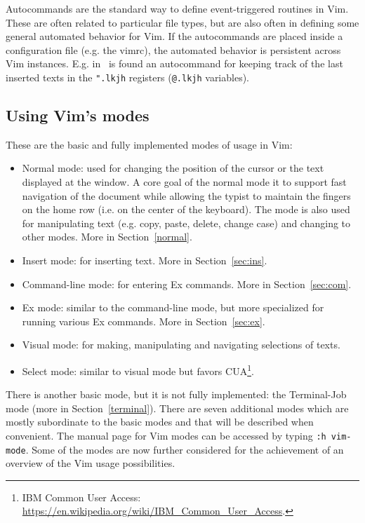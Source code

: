 \documentclass{article}
\newcommand{\tttt}[1]{\texttt{#1}}
\begin{document}
Autocommands are the standard way to define event-triggered routines in Vim.
These are often related to particular file types, but are also often
in defining some general automated behavior for Vim.
If the autocommands are placed inside a configuration file (e.g. the
vimrc), the automated behavior is persistent across Vim instances.
E.g. in~\cite{vimrc} is found an autocommand for keeping track of the last inserted texts in the \tttt{".lkjh} registers (\tttt{@.lkjh} variables).

\subsection{Using Vim's modes}\label{modes}
These are the  basic and fully implemented modes of usage in Vim:
\begin{itemize}
  \item Normal mode: used for changing
  the position of the cursor or the text displayed
  at the window.
  A core goal of the normal mode it to support fast
  navigation of the document while allowing
  the typist to maintain the fingers on the home row
  (i.e. on the center of the keyboard).
  The mode is also used for manipulating text
  (e.g. copy, paste, delete, change case) and
    changing to other modes.
    More in Section~\ref{normal}.
  \item Insert mode: for inserting text. More in
    Section~\ref{sec:ins}.
  \item Command-line mode: for entering Ex commands. More in
    Section~\ref{sec:com}.
  \item Ex mode: similar to the command-line mode,
  but more specialized for running various Ex commands.
    More in Section~\ref{sec:ex}.
  \item Visual mode: for making, manipulating and navigating
  selections of texts.
  \item Select mode: similar to visual mode but
  favors CUA\footnote{IBM Common User Access:
    \url{https://en.wikipedia.org/wiki/IBM_Common_User_Access}.}.
\end{itemize}

There is another basic mode, but it is not fully implemented:
the Terminal-Job mode (more in Section~\ref{terminal}).
There are seven additional modes which are mostly subordinate 
to the basic modes and that will be described when convenient.
The manual page for Vim modes can be accessed by typing
\texttt{:h vim-mode}.
Some of the modes are now further considered for
the achievement of
an overview of the Vim usage possibilities.
\end{document}

